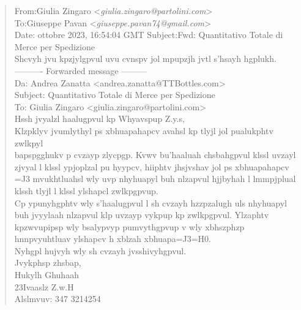 \footnotesize
\begin{tcolorbox}[colback=gray!20, colframe=gray!50,sharp corners=southwest]
\begin{quote}
From:\qquad Giulia Zingaro <\textit{giulia.zingaro@partolini.com}>\\
To:\qquad Giuseppe Pavan <\textit{giuseppe.pavan74@gmail.com}>\\
Date: ottobre 2023, 16:54:04 GMT
Subject:\qquad Fwd: Quantitativo Totale di Merce per Spedizione\vspace{14pt}\\
Shcvyh jvu kpzjylgpvul uvu cvnspv jol mpupzjh jvtl s'hsayh hgplukh.\vspace{14pt}\\
---------- Forwarded message ---------\\
Da: Andrea Zanatta <andrea.zanatta@TTBottles.com>\\
Subject: Quantitativo Totale di Merce per Spedizione\\
To: Giulia Zingaro <giulia.zingaro@partolini.com>\vspace{14pt}\\
Hssh jvyalzl haalugpvul kp Whyavspup Z.y.s,\vspace{14pt}\\
Klzpklyv jvumlythyl ps xbhuapahapcv avahsl kp tlyjl jol pualukphtv zwlkpyl\\
bapspgghukv p cvzayp zlycpgp. Kvwv bu'haaluah chsbahgpvul klssl uvzayl zjvyal l klssl ypjoplzal pu hyypcv, hiiphtv jhsjvshav jol ps xbhuapahapcv\vspace{14pt}\\
=J3 mvukhtluahsl wly uvp nhyhuapyl buh nlzapvul hjjbyhah l lmmpjplual klssh tlyjl l klssl ylshapcl zwlkpgpvup.\vspace{14pt}\\
Cp ypunyhgphtv wly s'haalugpvul l sh cvzayh hzzpzalugh uls nhyhuapyl buh jvyylaah nlzapvul klp uvzayp vykpup kp zwlkpgpvul. Ylzaphtv kpzwvupipsp wly bsalypvyp pumvythgpvup v wly xbhszphzp hnnpvyuhtluav ylshapcv h xblzah xbhuapa=J3=H0.\vspace{14pt}\\
Nyhgpl hujvyh wly sh cvzayh jvsshivyhgpvul.\vspace{14pt}\\
Jvykphsp zhsbap,\\
Hukylh Ghuhaah\\
23Ivaaslz Z.w.H\\
Alslmvuv: 347 3214254
\end{quote}
\end{tcolorbox}
